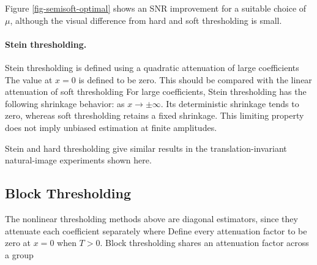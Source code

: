 
Figure \ref{fig-semisoft-optimal} shows an SNR improvement for a suitable choice of $\mu$, although the visual difference from hard and soft thresholding is small.


  
\paragraph{Stein thresholding.}

Stein thresholding is defined using a quadratic attenuation of large coefficients
The value at $x=0$ is defined to be zero. This should be compared with the linear attenuation of soft thresholding
For large coefficients, Stein thresholding has the following shrinkage behavior:
as $x \rightarrow \pm \infty$. Its deterministic shrinkage tends to zero, whereas soft thresholding retains a fixed shrinkage. This limiting property does not imply unbiased estimation at finite amplitudes.


Stein and hard thresholding give similar results in the translation-invariant natural-image experiments shown here.

                                                     
\subsection{Block Thresholding}

The nonlinear thresholding methods above are diagonal estimators, since they attenuate each coefficient separately
where 
Define every attenuation factor to be zero at $x=0$ when $T>0$. Block thresholding shares an attenuation factor across a group 